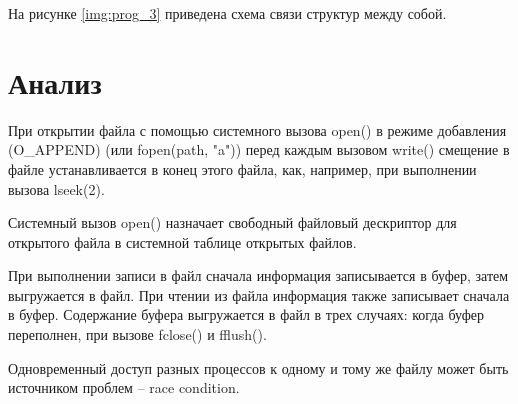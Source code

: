 На рисунке \ref{img:prog_3} приведена схема связи структур между собой.
\begin{figure}[H]
\end{figure}

\section{Анализ}
При открытии файла с помощью системного вызова open() в режиме добавления (O\_APPEND) (или fopen(path, "a")) перед каждым вызовом write() смещение в файле устанавливается в конец этого файла, как, например, при выполнении вызова lseek(2).

Системный вызов open() назначает свободный файловый дескриптор для открытого файла в системной таблице открытых файлов. 

При выполнении записи в файл сначала информация записывается в буфер, затем выгружается в файл. При чтении из файла информация также записывает сначала в буфер. Содержание буфера выгружается в файл в трех случаях: когда буфер переполнен, при вызове fclose() и fflush(). 

Одновременный доступ разных процессов к одному и тому же файлу может быть источником проблем -- race condition.

